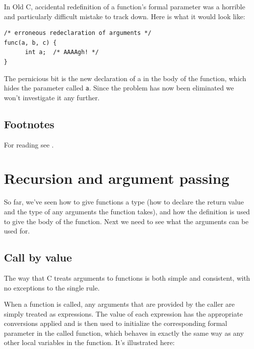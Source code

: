    In Old C, accidental redefinition of a function's formal parameter was
    a horrible and particularly difficult mistake to track down. Here is
    what it would look like:

\begin{Verbatim}
/* erroneous redeclaration of arguments */
func(a, b, c) {
      int a;  /* AAAAgh! */
}
\end{Verbatim}

   The pernicious bit is the new declaration of a in the body of the
    function, which hides the parameter called \texttt{a}. Since the
    problem has now been eliminated we won't investigate it any further.


    \subsection{Footnotes}
    For reading see \cite{Stro}. 



        \section{Recursion and argument passing}
        

  

  So far, we've seen how to give functions a type (how to declare the
   return value and the type of any arguments the function takes), and how
   the definition is used to give the body of the function. Next we need to
   see what the arguments can be used for.


  \subsection{Call by value}
   

   The way that C treats arguments to functions is both simple and
    consistent, with no exceptions to the single rule.


   When a function is called, any arguments that are provided by the
    caller are simply treated as expressions. The value of each expression
    has the appropriate conversions applied and is then used to initialize
    the corresponding formal parameter in the called function, which behaves
    in exactly the same way as any other local variables in the function.
    It's illustrated here:


